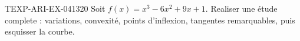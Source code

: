 \begin{exercice}{TEXP-ARI-EX-041}{3}{20}
Soit $f(x) = x^3 - 6x^2 + 9x + 1$. Realiser une étude complete : variations, convexité, points d'inflexion, tangentes remarquables, puis esquisser la courbe.

\end{exercice}
